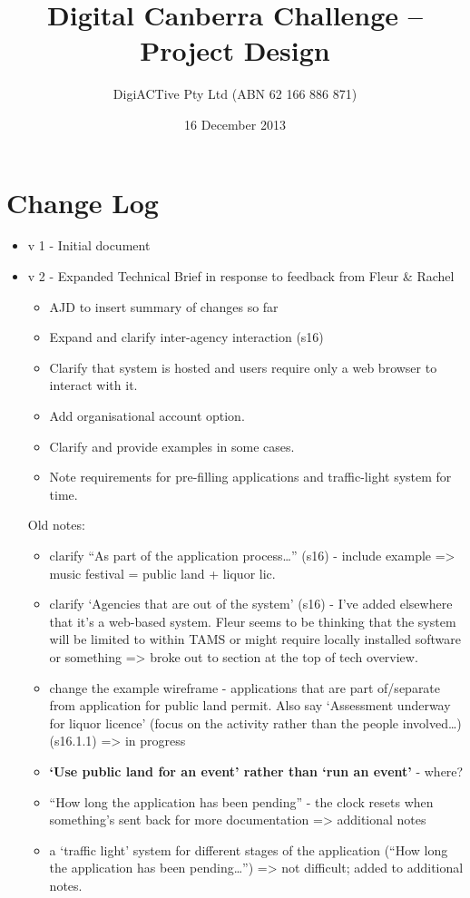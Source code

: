 \documentclass[12pt,a4paper,twosided]{article}
\title{Digital Canberra Challenge -- Project Design}
\author{DigiACTive Pty Ltd (ABN 62 166 886 871)}
\date{16 December 2013}
\begin{document}
\maketitle
\section*{Change Log}

\begin{itemize}
\itemsep1pt\parskip0pt
\item
  v 1 - Initial document
\item
  v 2 - Expanded Technical Brief in response to feedback from Fleur \&
  Rachel

  \begin{itemize}
  \itemsep1pt\parskip0pt
  \item
    AJD to insert summary of changes so far
  \item
    Expand and clarify inter-agency interaction (s16)
  \item
    Clarify that system is hosted and users require only a web browser
    to interact with it.
  \item
    Add organisational account option.
  \item
    Clarify and provide examples in some cases.
  \item
    Note requirements for pre-filling applications and traffic-light
    system for time.
  \end{itemize}

  Old notes:

  \begin{itemize}
  \itemsep1pt\parskip0pt
  \item
    clarify ``As part of the application process\ldots{}'' (s16) -
    include example =\textgreater{} music festival = public land +
    liquor lic.
  \item
    clarify `Agencies that are out of the system' (s16) - I've added
    elsewhere that it's a web-based system. Fleur seems to be thinking
    that the system will be limited to within TAMS or might require
    locally installed software or something =\textgreater{} broke out to
    section at the top of tech overview.
  \item
    change the example wireframe - applications that are part
    of/separate from application for public land permit. Also say
    `Assessment underway for liquor licence' (focus on the activity
    rather than the people involved\ldots{}) (s16.1.1) =\textgreater{}
    in progress
  \item
    \textbf{`Use public land for an event' rather than `run an event'} -
    where?
  \item
    ``How long the application has been pending'' - the clock resets
    when something's sent back for more documentation =\textgreater{}
    additional notes
  \item
    a `traffic light' system for different stages of the application
    (``How long the application has been pending\ldots{}'')
    =\textgreater{} not difficult; added to additional notes.
  \end{itemize}
\end{itemize}
\end{document}
